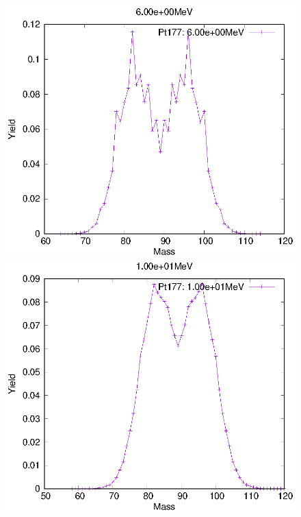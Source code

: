 \begin{figure}[htbp]
 \begin{minipage}{0.33\textwidth} \begin{center} \includegraphics[width=\textwidth]{YA/Pt177_6.00e+00.eps} \end{center} \end{minipage}
\begin{minipage}{0.33\textwidth} \begin{center} \includegraphics[width=\textwidth]{YA/Pt177_1.00e+01.eps} \end{center} \end{minipage}

\end{figure}
